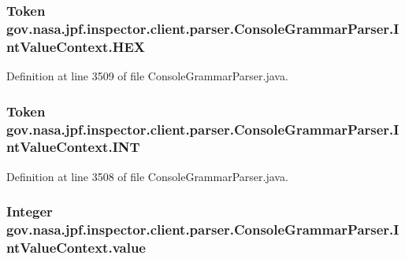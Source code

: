 \subsubsection[{\texorpdfstring{H\+EX}{HEX}}]{\setlength{\rightskip}{0pt plus 5cm}Token gov.\+nasa.\+jpf.\+inspector.\+client.\+parser.\+Console\+Grammar\+Parser.\+Int\+Value\+Context.\+H\+EX}\hypertarget{classgov_1_1nasa_1_1jpf_1_1inspector_1_1client_1_1parser_1_1_console_grammar_parser_1_1_int_value_context_af63813be738f90dbf1de9e2fb36aa35e}{}\label{classgov_1_1nasa_1_1jpf_1_1inspector_1_1client_1_1parser_1_1_console_grammar_parser_1_1_int_value_context_af63813be738f90dbf1de9e2fb36aa35e}


Definition at line 3509 of file Console\+Grammar\+Parser.\+java.

\subsubsection[{\texorpdfstring{I\+NT}{INT}}]{\setlength{\rightskip}{0pt plus 5cm}Token gov.\+nasa.\+jpf.\+inspector.\+client.\+parser.\+Console\+Grammar\+Parser.\+Int\+Value\+Context.\+I\+NT}\hypertarget{classgov_1_1nasa_1_1jpf_1_1inspector_1_1client_1_1parser_1_1_console_grammar_parser_1_1_int_value_context_aab107d69891a0998e8a1236175dda33d}{}\label{classgov_1_1nasa_1_1jpf_1_1inspector_1_1client_1_1parser_1_1_console_grammar_parser_1_1_int_value_context_aab107d69891a0998e8a1236175dda33d}


Definition at line 3508 of file Console\+Grammar\+Parser.\+java.

\subsubsection[{\texorpdfstring{value}{value}}]{\setlength{\rightskip}{0pt plus 5cm}Integer gov.\+nasa.\+jpf.\+inspector.\+client.\+parser.\+Console\+Grammar\+Parser.\+Int\+Value\+Context.\+value}\hypertarget{classgov_1_1nasa_1_1jpf_1_1inspector_1_1client_1_1parser_1_1_console_grammar_parser_1_1_int_value_context_a47964dd9f967981f0b77c57b35833709}{}\label{classgov_1_1nasa_1_1jpf_1_1inspector_1_1client_1_1parser_1_1_console_grammar_parser_1_1_int_value_context_a47964dd9f967981f0b77c57b35833709}


